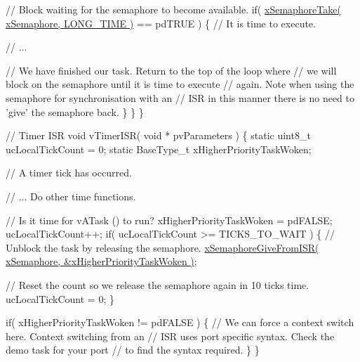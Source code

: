 \begin{DoxyPre}       // Block waiting for the semaphore to become available.
       if( \hyperlink{semphr_8h_af116e436d2a5ae5bd72dbade2b5ea930}{xSemaphoreTake( xSemaphore, LONG\_TIME )} == pdTRUE )
       \{
           // It is time to execute.\end{DoxyPre}



\begin{DoxyPre}           // ...\end{DoxyPre}



\begin{DoxyPre}           // We have finished our task.  Return to the top of the loop where
           // we will block on the semaphore until it is time to execute
           // again.  Note when using the semaphore for synchronisation with an
        // ISR in this manner there is no need to 'give' the semaphore back.
       \}
   \}
\}\end{DoxyPre}



\begin{DoxyPre}// Timer ISR
void vTimerISR( void * pvParameters )
\{
static uint8\_t ucLocalTickCount = 0;
static BaseType\_t xHigherPriorityTaskWoken;\end{DoxyPre}



\begin{DoxyPre}   // A timer tick has occurred.\end{DoxyPre}



\begin{DoxyPre}   // ... Do other time functions.\end{DoxyPre}



\begin{DoxyPre}   // Is it time for vATask () to run?
   xHigherPriorityTaskWoken = pdFALSE;
   ucLocalTickCount++;
   if( ucLocalTickCount >= TICKS\_TO\_WAIT )
   \{
       // Unblock the task by releasing the semaphore.
       \hyperlink{semphr_8h_a68aa43df8b2a0dbe17d05fad74670ef0}{xSemaphoreGiveFromISR( xSemaphore, &xHigherPriorityTaskWoken )};\end{DoxyPre}



\begin{DoxyPre}       // Reset the count so we release the semaphore again in 10 ticks time.
       ucLocalTickCount = 0;
   \}\end{DoxyPre}



\begin{DoxyPre}   if( xHigherPriorityTaskWoken != pdFALSE )
   \{
       // We can force a context switch here.  Context switching from an
       // ISR uses port specific syntax.  Check the demo task for your port
       // to find the syntax required.
   \}
\}
\end{DoxyPre}
 
